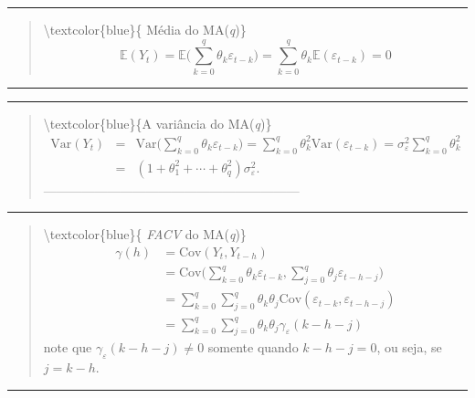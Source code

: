 \documentclass[
]{book}
\theoremstyle{definition}
\theoremstyle{definition}
\theoremstyle{definition}
\theoremstyle{remark}
\begin{document}
\begin{center}\rule{0.5\linewidth}{0.5pt}\end{center}

\begin{quote}
\textbackslash textcolor\{blue\}\{ Média do MA(\emph{q})\}
\[\mathbb{E} (Y_t ) = \mathbb{E}\Big(\sum_{k=0}^q \theta_k\varepsilon_{t-k}\Big)=\sum_{k=0}^q \theta_k\mathbb{E}(\varepsilon_{t-k})= 0\]
\end{quote}

\begin{center}\rule{0.5\linewidth}{0.5pt}\end{center}

\begin{center}\rule{0.5\linewidth}{0.5pt}\end{center}

\begin{quote}
\textbackslash textcolor\{blue\}\{A variância do MA(\emph{q})\}\\
\begin{eqnarray*}
\mbox{Var}(Y_t) &=& \mbox{Var}\Big(\sum_{k=0}^q \theta_k\varepsilon_{t-k}\Big) = \sum_{k=0}^q \theta_k^2\mbox{Var}(\varepsilon_{t-k}) = \sigma_\varepsilon^2\sum_{k=0}^q \theta_k^2\\
&=& (1 + \theta_1^2 +\cdots +\theta_q^2)\sigma_\varepsilon^2.
\end{eqnarray*}
------------------------------------------------------------
\end{quote}

\begin{center}\rule{0.5\linewidth}{0.5pt}\end{center}

\begin{quote}
\textbackslash textcolor\{blue\}\{ \emph{FACV} do MA(\emph{q})\}
\begin{align*}
\gamma(h)&=\mbox{Cov}(Y_t,Y_{t-h} )\\
&= \mbox{Cov}\Big(\sum_{k=0}^q \theta_k\varepsilon_{t-k},\sum_{j=0}^q \theta_j\varepsilon_{t-h-j}\Big)\\
&=\sum_{k=0}^q \sum_{j=0}^q\theta_k\theta_j\mbox{Cov}(\varepsilon_{t-k},\varepsilon_{t-h-j})\\
&=\sum_{k=0}^q \sum_{j=0}^q\theta_k\theta_j\gamma_\varepsilon(k-h-j)
\end{align*}
note que \(\gamma_\varepsilon(k-h-j)\neq 0\) somente quando \(k-h-j=0\), ou seja, se \(j=k-h\).
\end{quote}

\begin{center}\rule{0.5\linewidth}{0.5pt}\end{center}
\end{document}
